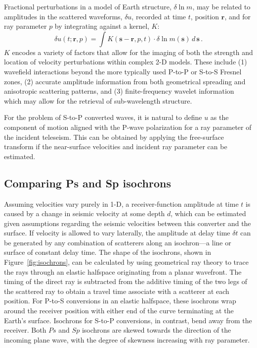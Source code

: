 \documentclass[referee]{gji}
\begin{document}
Fractional perturbations in a model of Earth structure, $\delta \ln{m}$, may be related to amplitudes in the scattered waveforms, $\delta u$, recorded at time $t$, position $\textbf{r}$, and for ray parameter $p$ by integrating against a kernel, $K$:
\begin{equation}
\delta u(t;\textbf{r},p) = \int K(\textbf{s}-\textbf{r},p,t) \cdot \delta \ln{m(\textbf{s})} \, d \, \textbf{s} \,.
\label{eqn:kernel_def}
\end{equation}
$K$ encodes a variety of factors that allow for the imaging of both the strength and location of velocity perturbations within complex 2-D models.  These include (1) wavefield interactions beyond the more typically used P-to-P or S-to-S Fresnel zones, (2) accurate amplitude information from both geometrical spreading and anisotropic scattering patterns, and (3) finite-frequency wavelet information which may allow for the retrieval of sub-wavelength structure.

For the problem of S-to-P converted waves, it is natural to define $u$ as the component of motion aligned with the P-wave polarization for a ray parameter of the incident teleseism.  This can be obtained by applying the free-surface transform \citep{Kennett1991a} if the near-surface velocities and incident ray parameter can be estimated.

\subsection{Comparing Ps and Sp isochrons}

Assuming velocities vary purely in 1-D, a receiver-function amplitude at time $t$ is caused by a change in seismic velocity at some depth $d$, which can be estimated given assumptions regarding the seismic velocities between this converter and the surface. If velocity is allowed to vary laterally, the amplitude at delay time $\delta t$ can be generated by any combination of scatterers along an isochron---a line or surface of constant delay time. The shape of the isochrons, shown in Figure~\ref{fig:isochrons}, can be calculated by using geometrical ray theory to trace the rays through an elastic halfspace originating from a planar wavefront.  The timing of the direct ray is subtracted from the additive timing of the two legs of the scattered ray to obtain a travel time associate with a scatterer at each position.  For P-to-S conversions in an elastic halfspace, these isochrons wrap around the receiver position with either end of the curve terminating at the Earth's surface.  Isochrons for S-to-P conversions, in contrast, bend away from the receiver.  Both $Ps$ and $Sp$ isochrons are skewed towards the direction of the incoming plane wave, with the degree of skewness increasing with ray parameter.
\end{document}
